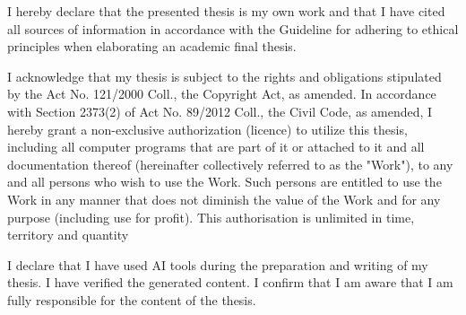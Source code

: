 \documentclass[english,master,oneside]{ctufit-thesis}
\begin{document}
\frontmatter\frontmatterinit %

\thispagestyle{empty}\maketitle\thispagestyle{empty}\cleardoublepage


\imprintpage %
\stopTOCentries




\begin{declarationpage}
I hereby declare that the presented thesis is my own work and that I have cited all sources of
information in accordance with the Guideline for adhering to ethical principles when elaborating an
academic final thesis.

I acknowledge that my thesis is subject to the rights and obligations stipulated by the Act No.
121/2000 Coll., the Copyright Act, as amended. In accordance with Section 2373(2) of Act No.
89/2012 Coll., the Civil Code, as amended, I hereby grant a non-exclusive authorization (licence) to
utilize this thesis, including all computer programs that are part of it or attached to it and all
documentation thereof (hereinafter collectively referred to as the "Work"), to any and all persons
who wish to use the Work. Such persons are entitled to use the Work in any manner that does not
diminish the value of the Work and for any purpose (including use for profit). This authorisation is
unlimited in time, territory and quantity

I declare that I have used AI tools during the preparation and writing of my thesis. I have verified
the generated content. I confirm that I am aware that I am fully responsible for the content of the
thesis.
\end{declarationpage}
\end{document}
